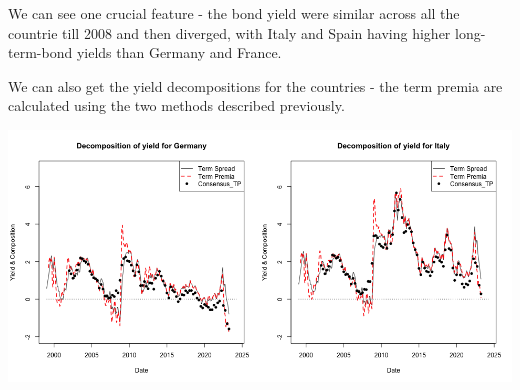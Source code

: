 \documentclass[
]{article}
\begin{document}
We can see one crucial feature - the bond yield were similar across all
the countrie till 2008 and then diverged, with Italy and Spain having
higher long-term-bond yields than Germany and France.

We can also get the yield decompositions for the countries - the term
premia are calculated using the two methods described previously.

\includegraphics[width=0.5\textwidth,height=\textheight]{Plots/Historical/Yield_decomposition_Germany.png}\includegraphics[width=0.5\textwidth,height=\textheight]{Plots/Historical/Yield_decomposition_Italy.png}
\end{document}
